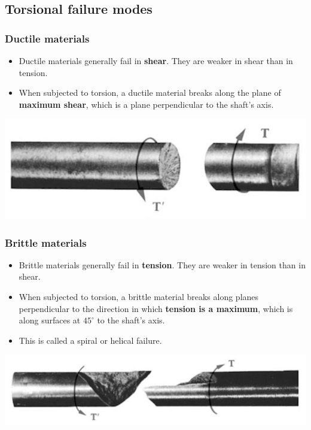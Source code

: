 \documentclass[11pt]{article}
\begin{document}
\newpage

\subsection{Torsional failure modes}
\label{sec:orga49debc}

\subsubsection{Ductile materials}
\label{sec:org8201285}
\begin{itemize}
\item Ductile materials generally fail in \textbf{shear}. They are weaker in shear than in tension.
\item When subjected to torsion, a ductile material breaks along the plane of \textbf{maximum shear}, which is a plane perpendicular to the shaft's axis.
\end{itemize}

\begin{center}
\includegraphics[width=.9\linewidth]{./images/ductile-material-torsional-failure.png}
\end{center}

\subsubsection{Brittle materials}
\label{sec:org14f01c6}
\begin{itemize}
\item Brittle materials generally fail in \textbf{tension}. They are weaker in tension than in shear.
\item When subjected to torsion, a brittle material breaks along planes perpendicular to the direction in which \textbf{tension is a maximum}, which is along surfaces at \(45^{\circ}\) to the shaft's axis.
\item This is called a spiral or helical failure.
\end{itemize}

\begin{center}
\includegraphics[width=.9\linewidth]{./images/brittle-material-torsional-failure.png}
\end{center}
\end{document}
